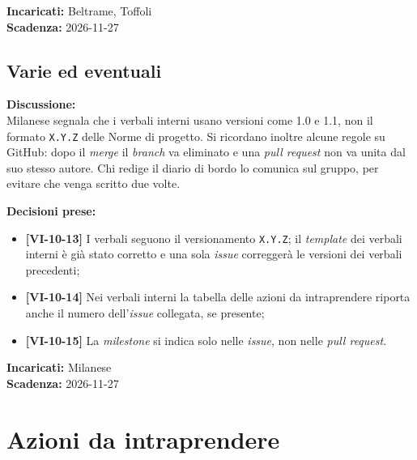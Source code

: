 \documentclass[12pt,a4paper]{article}
\newcommand{\vnum}{10}                     %
\newcommand{\tightlist}{\setlength{\itemsep}{1pt}\setlength{\parskip}{0pt}}
\begin{document}
\textbf{Incaricati:} Beltrame, Toffoli\\
\textbf{Scadenza:} 2026-11-27

\hypertarget{varie-ed-eventuali}{%
\subsection{Varie ed eventuali}}

\textbf{Discussione:}\\
Milanese segnala che i verbali interni usano versioni come 1.0 e 1.1, non il formato \texttt{X.Y.Z} delle Norme di progetto. Si ricordano inoltre alcune regole su GitHub: dopo il \emph{merge} il \emph{branch} va eliminato e una \emph{pull request} non va unita dal suo stesso autore. Chi redige il diario di bordo lo comunica sul gruppo, per evitare che venga scritto due volte.

\textbf{Decisioni prese:}
\begin{itemize}
\tightlist
\item[$\checkmark$] \textbf{[VI-\vnum-13]} I verbali seguono il versionamento \texttt{X.Y.Z}; il \emph{template} dei verbali interni è già stato corretto e una sola \emph{issue} correggerà le versioni dei verbali precedenti;
\item[$\checkmark$] \textbf{[VI-\vnum-14]} Nei verbali interni la tabella delle azioni da intraprendere riporta anche il numero dell'\emph{issue} collegata, se presente;
\item[$\checkmark$] \textbf{[VI-\vnum-15]} La \emph{milestone} si indica solo nelle \emph{issue}, non nelle \emph{pull request}.
\end{itemize}

\textbf{Incaricati:} Milanese\\
\textbf{Scadenza:} 2026-11-27

\newpage

\hypertarget{azioni-da-intraprendere}{%
\section{Azioni da intraprendere}}
\end{document}
